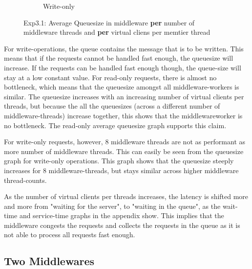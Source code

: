 \documentclass[11pt,a4paper]{article}
\begin{document}
\begin{figure}[H]
\begin{subfigure}{.5\textwidth}
    \caption{Write-only}
    \label{fig:mesh1}
\end{subfigure}
\caption{Exp3.1: Average Queuesize in middleware \textbf{per} number of middleware threads and \textbf{per} virtual cliens per memtier thread}
\label{fig:test}
\end{figure}

For write-operations, the queue contains the message that is to be written.
This means that if the requests cannot be handled fast enough, the queuesize will increase.
If the requests can be handled fast enough though, the queue-size will stay at a low constant value.
For read-only requests, there is almost no bottleneck, which means that the queuesize amongst all middleware-workers is similar.
The queuesize increases with an increasing number of virtual clients per threads, but because the all the queuesizes (across a different number of middleware-threads) increase together, this shows that the middlewareworker is no bottleneck.
The read-only average queuesize graph supports this claim.

For write-only requests, however, 8 middleware threads are not as performant as more number of middleware threads.
This can easily be seen from the queuesize graph for write-only operations.
This graph shows that the queuesize steeply increases for 8 middleware-threads, but stays similar across higher middleware thread-counts.

As the number of virtual clients per threads increases, the latency is shifted more and more  from "waiting for the server", to "waiting in the queue", as the wait-time and service-time graphs in the appendix show.
This implies that the middleware congests the requests and collects the requests in the queue as it is not able to process all requests fast enough.

\subsection{Two Middlewares}
\end{document}
